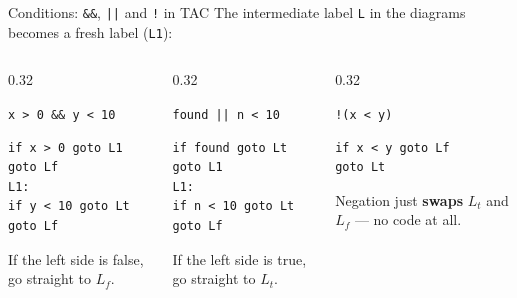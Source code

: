 \documentclass[aspectratio=169,11pt,xcolor=table]{beamer}
\newcommand{\tc}[1]{\texttt{#1}}
\begin{document}
\begin{frame}[fragile]{Conditions: \tc{\&\&}, \tc{||} and \tc{!} in TAC}
  The intermediate label \tc{L} in the diagrams becomes a fresh label (\tc{L1}):

  \medskip
  \begin{columns}[T]
    \begin{column}{0.32\textwidth}
      \begin{block}{\tc{x > 0 \&\& y < 10}}
        \begin{verbatim}
if x > 0 goto L1
goto Lf
L1:
if y < 10 goto Lt
goto Lf
        \end{verbatim}
      \end{block}
      \scriptsize If the left side is false, go straight to $L_f$.
    \end{column}
    \begin{column}{0.32\textwidth}
      \begin{block}{\tc{found || n < 10}}
        \begin{verbatim}
if found goto Lt
goto L1
L1:
if n < 10 goto Lt
goto Lf
        \end{verbatim}
      \end{block}
      \scriptsize If the left side is true, go straight to $L_t$.
    \end{column}
    \begin{column}{0.32\textwidth}
      \begin{block}{\tc{!(x < y)}}
        \begin{verbatim}
if x < y goto Lf
goto Lt
        \end{verbatim}
      \end{block}
      \scriptsize Negation just \textbf{swaps} $L_t$ and $L_f$ — no code at all.
    \end{column}
  \end{columns}
\end{frame}
\end{document}
